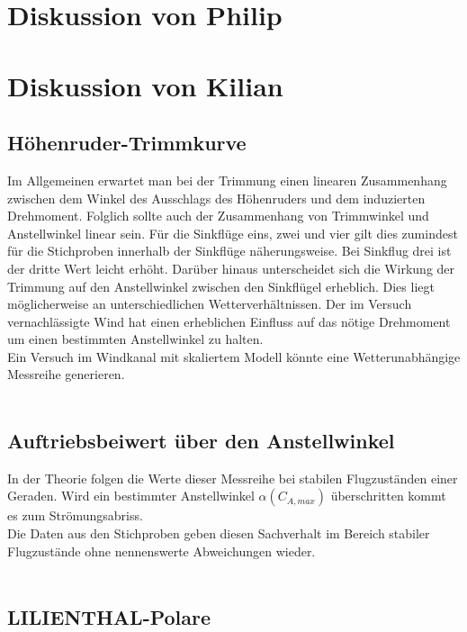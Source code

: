 \newpage

\section{Diskussion von Philip}
\newpage

\section{Diskussion von Kilian}
\subsection{Höhenruder-Trimmkurve}

Im Allgemeinen erwartet man bei der Trimmung einen linearen Zusammenhang zwischen dem Winkel des Ausschlags des Höhenruders und dem induzierten Drehmoment. Folglich sollte auch der Zusammenhang von Trimmwinkel und Anstellwinkel linear sein. Für die Sinkflüge eins, zwei und vier gilt dies zumindest für die Stichproben innerhalb der Sinkflüge näherungsweise. Bei Sinkflug drei ist der dritte Wert leicht erhöht. Darüber hinaus unterscheidet sich die Wirkung der Trimmung auf den Anstellwinkel zwischen den Sinkflügel erheblich. Dies liegt möglicherweise an unterschiedlichen Wetterverhältnissen. Der im Versuch vernachlässigte Wind hat einen erheblichen Einfluss auf das nötige Drehmoment um einen bestimmten Anstellwinkel zu halten.\\
Ein Versuch im Windkanal mit skaliertem Modell könnte eine Wetterunabhängige Messreihe generieren.\\\\

\subsection{Auftriebsbeiwert über den Anstellwinkel}

In der Theorie folgen die Werte dieser Messreihe bei stabilen Flugzuständen einer Geraden. Wird ein bestimmter Anstellwinkel $\alpha({C_{A,max}})$ überschritten kommt es zum Strömungsabriss.\\
Die Daten aus den Stichproben geben diesen Sachverhalt im Bereich stabiler Flugzustände ohne nennenswerte Abweichungen wieder.\\\\

\subsection{LILIENTHAL-Polare}

